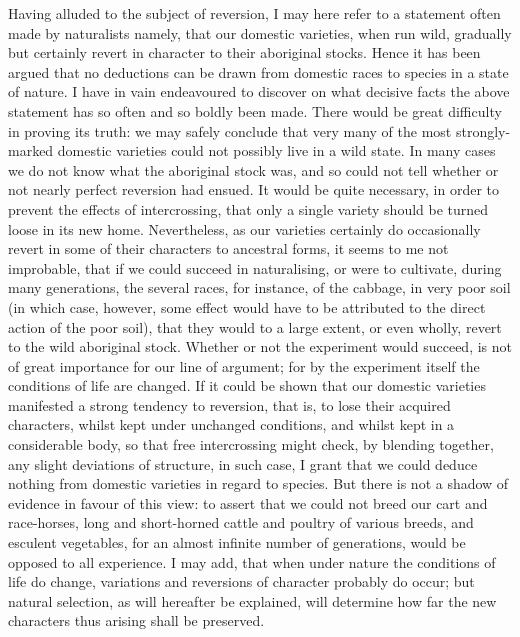 \indent Having alluded to the subject of reversion, I may here refer to a statement often made by naturalists namely, that our domestic varieties, when run wild, gradually but certainly revert in character to their aboriginal stocks.  Hence it has been argued that no deductions can be drawn from domestic races to species in a state of nature. I have in vain endeavoured to discover on what decisive facts the above statement has so often and so boldly been made. There would be great difficulty in proving its truth: we may safely conclude that very many of the most strongly-marked domestic varieties could not possibly live in a wild state.  In many cases we do not know what the aboriginal stock was, and so could not tell whether or not nearly perfect reversion had ensued. It would be quite necessary, in order to prevent the effects of intercrossing, that only a single variety should be turned loose in its new home.  Nevertheless, as our varieties certainly do occasionally revert in some of their characters to ancestral forms, it seems to me not improbable, that if we could succeed in naturalising, or were to cultivate, during many generations, the several races, for instance, of the cabbage, in very poor soil (in which case, however, some effect would have to be attributed to the direct action of the poor soil), that they would to a large extent, or even wholly, revert to the wild aboriginal stock. Whether or not the experiment would succeed, is not of great importance for our line of argument; for by the experiment itself the conditions of life are changed. If it could be shown that our domestic varieties manifested a strong tendency to reversion, that is, to lose their acquired characters, whilst kept under unchanged conditions, and whilst kept in a considerable body, so that free intercrossing might check, by blending together, any slight deviations of structure, in such case, I grant that we could deduce nothing from domestic varieties in regard to species. But there is not a shadow of evidence in favour of this view: to assert that we could not breed our cart and race-horses, long and short-horned cattle and poultry of various breeds, and esculent vegetables, for an almost infinite number of generations, would be opposed to all experience. I may add, that when under nature the conditions of life do change, variations and reversions of character probably do occur; but natural selection, as will hereafter be explained, will determine how far the new characters thus arising shall be preserved.  \\
